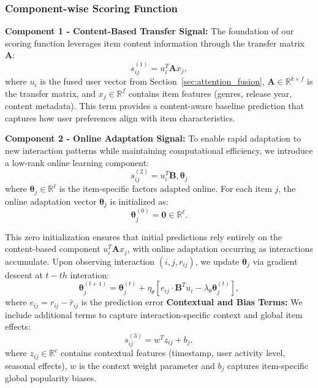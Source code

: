 \documentclass[acmsmall]{acmart}
\begin{document}
\subsubsection{Component-wise Scoring Function}

\textbf{Component 1 - Content-Based Transfer Signal:} The foundation of our scoring function leverages item content information through the transfer matrix $\mathbf{A}$:
\begin{equation}
s^{(1)}_{ij} = u_i^T \mathbf{A} x_j,
\label{eq:transfer_component}
\end{equation}
where $u_i$ is the fused user vector from Section~\ref{sec:attention_fusion}, $\mathbf{A} \in \mathbb{R}^{k \times f}$ is the transfer matrix, and $x_j \in \mathbb{R}^f$ contains item features (genres, release year, content metadata). This term provides a content-aware baseline prediction that captures how user preferences align with item characteristics.

\textbf{Component 2 - Online Adaptation Signal:} To enable rapid adaptation to new interaction patterns while maintaining computational efficiency, we introduce a low-rank online learning component:
\begin{equation}
s^{(2)}_{ij} = u_i^T \mathbf{B},\boldsymbol{\theta}_j
\label{eq:online_component}
\end{equation}
where $\boldsymbol{\theta}_j \in \mathbb{R}^\ell$ is the item-specific factors adapted online. For each item $j$, the online adaptation vector $\boldsymbol{\theta}_j$ is initialized as:
\begin{equation}
\boldsymbol{\theta}_j^{(0)} = \mathbf{0} \in \mathbb{R}^\ell.
\label{eq:theta_initialization}
\end{equation}

This zero initialization ensures that initial predictions rely entirely on the content-based component $u_i^T \mathbf{A} x_j$, with online adaptation occurring as interactions accumulate. Upon observing interaction $(i,j,r_{ij})$, we update $\boldsymbol{\theta}_j$ via gradient descent at $t-th$ interation:
\begin{equation}
\boldsymbol{\theta}_j^{(t+1)} = \boldsymbol{\theta}_j^{(t)} + \eta_\theta \left[e_{ij} \cdot \mathbf{B}^T u_i - \lambda_\theta \boldsymbol{\theta}_j^{(t)}\right],
\label{eq:theta_update}
\end{equation}
where $e_{ij} = r_{ij} - \hat{r}_{ij}$ is the prediction error
\textbf{Contextual and Bias Terms:} We include additional terms to capture interaction-specific context and global item effects:
\begin{equation}
s^{(3)}_{ij} = w^T z_{ij} + b_j,
\label{eq:context_bias}
\end{equation}
where $z_{ij} \in \mathbb{R}^c$ contains contextual features (timestamp, user activity level, seasonal effects), $w$ is the context weight parameter and $b_j$ captures item-specific global popularity biases.
\end{document}
